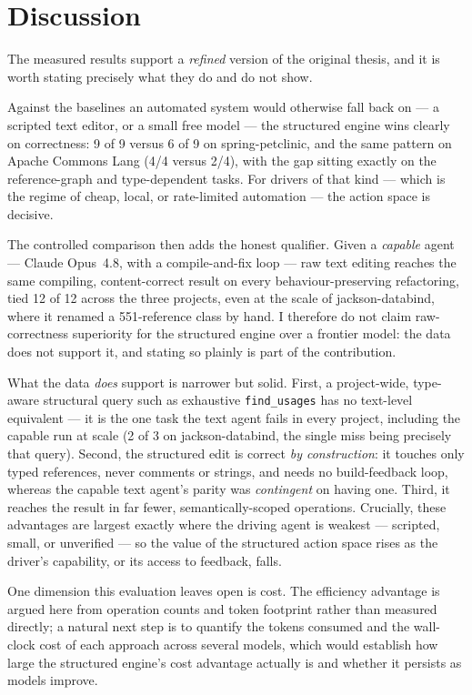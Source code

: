 \section{Discussion}
\label{sec:eval-discussion}
The measured results support a \emph{refined} version of the original thesis, and
it is worth stating precisely what they do and do not show.

Against the baselines an automated system would otherwise fall back on --- a scripted
text editor, or a small free model --- the structured engine wins clearly on
correctness: 9 of 9 versus 6 of 9 on spring-petclinic, and the same pattern on Apache
Commons Lang (4/4 versus 2/4), with the gap sitting exactly on the reference-graph and
type-dependent tasks. For drivers of that kind --- which is the regime of cheap, local,
or rate-limited automation --- the action space is decisive.

The controlled comparison then adds the honest qualifier. Given a \emph{capable} agent
--- Claude Opus~4.8, with a compile-and-fix loop --- raw text editing reaches the same
compiling, content-correct result on every behaviour-preserving refactoring, tied 12 of
12 across the three projects, even at the scale of jackson-databind, where it renamed a
551-reference class by hand. I therefore do not claim raw-correctness superiority for
the structured engine over a frontier model: the data does not support it, and stating
so plainly is part of the contribution.

What the data \emph{does} support is narrower but solid. First, a project-wide,
type-aware structural query such as exhaustive \texttt{find\_usages} has no text-level
equivalent --- it is the one task the text agent fails in every project, including the
capable run at scale (2 of 3 on jackson-databind, the single miss being precisely that
query). Second, the structured edit is correct \emph{by construction}: it touches only
typed references, never comments or strings, and needs no build-feedback loop, whereas
the capable text agent's parity was \emph{contingent} on having one. Third, it reaches
the result in far fewer, semantically-scoped operations. Crucially, these advantages are
largest exactly where the driving agent is weakest --- scripted, small, or unverified
--- so the value of the structured action space rises as the driver's capability, or its
access to feedback, falls.

One dimension this evaluation leaves open is cost. The efficiency advantage is argued
here from operation counts and token footprint rather than measured directly; a natural
next step is to quantify the tokens consumed and the wall-clock cost of each approach
across several models, which would establish how large the structured engine's cost
advantage actually is and whether it persists as models improve.
